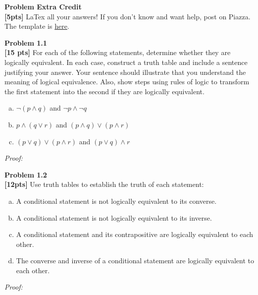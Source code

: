 \documentclass{article}
\newenvironment{problem}[2][Problem]
    { \begin{mdframed}[backgroundcolor=gray!20] \textbf{#1 #2} \\}
    {  \end{mdframed}}
\newenvironment{solution}
    {\textit{Proof:}}
    {}
\begin{document}
\begin{problem}{Extra Credit}
\textbf{[5pts]} LaTex all your answers! If you don't know and want help, post on Piazza. The template is \href{https://www.overleaf.com/read/gnqfhyjnrysh}{here}.  
\end{problem}

\begin{problem}{1.1}
\textbf{[15 pts]} For each of the following statements, determine whether they are logically equivalent. In each case, construct a truth table and include a sentence justifying your answer. Your sentence should illustrate that you understand the meaning of logical equivalence. Also, show steps using rules of logic to transform the first statement into the second if they are logically equivalent. 
\begin{enumerate}[a)]
    \item $\neg(p \land q)$ and $\neg p \land \neg q$
    \item $p \land (q \lor r)$ and $(p \land q) \lor (p \land r)$
    \item $(p \lor q) \lor (p \land r)$ and $(p \lor q) \land r$
\end{enumerate}
\end{problem}

\begin{solution}
\end{solution}
\newpage  %

\begin{problem}{1.2}
\textbf{[12pts]} Use truth tables to establish the truth of each statement:
\begin{enumerate}[a)]
\item A conditional statement is not logically equivalent to its converse.
\item A conditional statement is not logically equivalent to its inverse.
\item A conditional statement and its contrapositive are logically equivalent to each other.
\item The converse and inverse of a conditional statement are logically equivalent to each other.
\end{enumerate}
\end{problem}

\begin{solution}
\end{solution}
\newpage %
\end{document}
